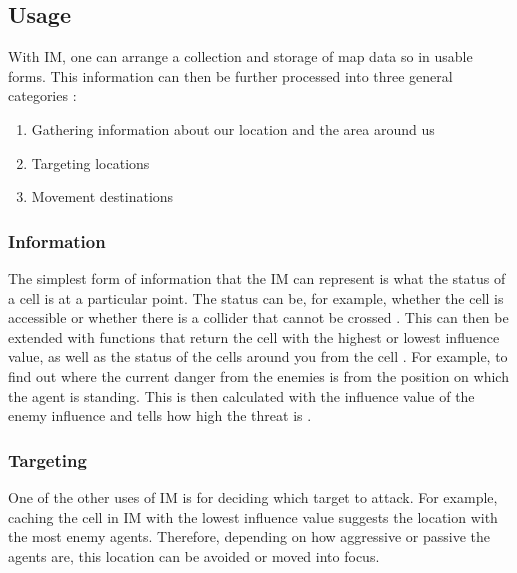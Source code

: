 \documentclass[]{report}
\begin{document}
	\newpage
	\subsection{Usage} \label{usage}
	With \ac{IM}, one can arrange a collection and storage of map data so in usable forms. This information can then be further processed into three general categories \citep{gameAIPro}:
	
	\begin{enumerate}
		\item Gathering information about our location and the area around us \citep{gameAIPro}
		\item Targeting locations \citep{gameAIPro}
		\item Movement destinations \citep{gameAIPro}
	\end{enumerate}
	
	\subsubsection{Information}
	The simplest form of information that the \ac{IM} can represent is what the status of a cell is at a particular point. The status can be, for example, whether the cell is accessible or whether there is a collider that cannot be crossed \citep{gameAIPro}. This can then be extended with functions that return the cell with the highest or lowest influence value, as well as the status of the cells around you from the cell \citep{gameAIPro}. 
	For example, to find out where the current danger from the enemies is from the position on which the agent is standing. This is then calculated with the influence value of the enemy influence and tells how high the threat is \citep{gameAIPro}. 
	
	\subsubsection{Targeting}
	One of the other uses of \ac{IM} is for deciding which target to attack. For example, caching the cell in \ac{IM} with the lowest influence value suggests the location with the most enemy agents. Therefore, depending on how aggressive or passive the agents are, this location can be avoided or moved into focus. \citep{gameAIPro}
	
\end{document}
